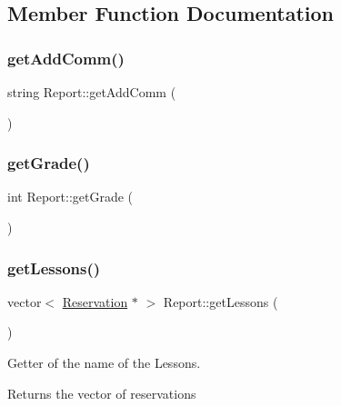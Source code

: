 \subsection{Member Function Documentation}
\mbox{\label{class_report_aea25a47f972d0048ae7f788218636c65}} 
\subsubsection{\texorpdfstring{get\+Add\+Comm()}{getAddComm()}}
{\footnotesize\ttfamily string Report\+::get\+Add\+Comm (\begin{DoxyParamCaption}{ }\end{DoxyParamCaption})}

\mbox{\label{class_report_a56fcac206c401ebc51d35fbe907ad729}} 
\subsubsection{\texorpdfstring{get\+Grade()}{getGrade()}}
{\footnotesize\ttfamily int Report\+::get\+Grade (\begin{DoxyParamCaption}{ }\end{DoxyParamCaption})}

\mbox{\label{class_report_a2915547d50dfefb1eae33f12ed0942d8}} 
\subsubsection{\texorpdfstring{get\+Lessons()}{getLessons()}}
{\footnotesize\ttfamily vector$<$ \mbox{\hyperlink{class_reservation}{Reservation}} $\ast$ $>$ Report\+::get\+Lessons (\begin{DoxyParamCaption}{ }\end{DoxyParamCaption})}



Getter of the name of the Lessons. 

\begin{DoxyReturn}{Returns}
the vector of reservations 
\end{DoxyReturn}
\mbox{\label{class_report_aaeac48b6c10c5bbf240fc518b6d45d05}} 

